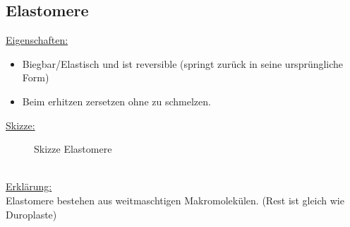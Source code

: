 \documentclass[../main.tex]{subfiles}
\begin{document}
\subsection{Elastomere}
\underline{Eigenschaften:}
\begin{itemize}
    \item Biegbar/Elastisch und ist reversible (springt zurück in seine ursprüngliche Form)
    \item Beim erhitzen zersetzen ohne zu schmelzen.
\end{itemize}
\newpage
\underline{Skizze:}
\begin{figure}[ht]
    \centering
    \caption{Skizze Elastomere}
    \label{fig:skizze_elastomere}
\end{figure}
%
\\
\underline{Erklärung:}
\\
Elastomere bestehen aus weitmaschtigen Makromolekülen. (Rest ist gleich wie Duroplaste)
\newpage
%
%
\end{document}
